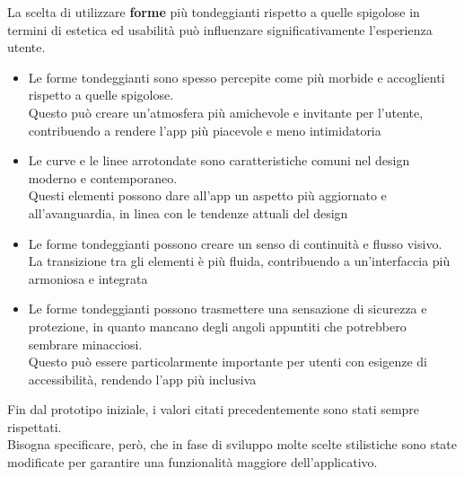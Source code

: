 \documentclass{article}
\begin{document}
		La scelta di utilizzare \textbf{forme} più tondeggianti rispetto a quelle spigolose in termini di estetica ed usabilità può influenzare significativamente l'esperienza utente.
		\begin{itemize}
			\item Le forme tondeggianti sono spesso percepite come più morbide e accoglienti rispetto a quelle spigolose.\\ Questo può creare un'atmosfera più amichevole e invitante per l'utente, contribuendo a rendere l'app più piacevole e meno intimidatoria
			\item Le curve e le linee arrotondate sono caratteristiche comuni nel design moderno e contemporaneo. \\Questi elementi possono dare all'app un aspetto più aggiornato e all'avanguardia, in linea con le tendenze attuali del design
			\item Le forme tondeggianti possono creare un senso di continuità e flusso visivo. La transizione tra gli elementi è più fluida, contribuendo a un'interfaccia più armoniosa e integrata
			\item Le forme tondeggianti possono trasmettere una sensazione di sicurezza e protezione, in quanto mancano degli angoli appuntiti che potrebbero sembrare minacciosi. \\Questo può essere particolarmente importante per utenti con esigenze di accessibilità, rendendo l'app più inclusiva
		\end{itemize}
		Fin dal prototipo iniziale, i valori citati precedentemente sono stati sempre rispettati.\\
		Bisogna specificare, però, che in fase di sviluppo molte scelte stilistiche sono state modificate per garantire una funzionalità maggiore dell'applicativo.\\
\end{document}
